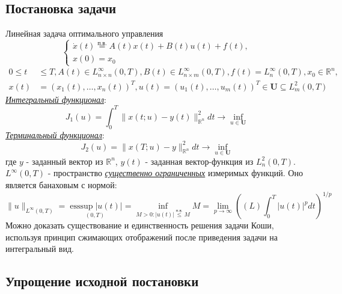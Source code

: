 \documentclass[A4]{article}
\begin{document}
\subsection{Постановка задачи}
Линейная задача оптимального управления
\begin{equation*}
\left\{\begin{array}{l}
\dot{x}(t)\stackrel{\text{п.в.}}{=}A(t)x(t)+B(t)u(t)+f(t),\\
x(0)=x_0
\end{array}\right.
\end{equation*}
\begin{equation*}
\begin{aligned}
0\leqslant t&\leqslant T,A(t)\in L^{\infty}_{n\times n}(0,T),B(t)\in L^{\infty}_{n\times m}(0,T),f(t)=L^{\infty}_{n}(0,T),x_0\in\mathbb{R}^n,\\
x(t)&=(x_1(t),\ldots,x_n(t))^T,u(t)=(u_1(t),\ldots,u_m(t))^T\in\mathbf{U}\subseteq L^2_m(0,T)
\end{aligned}
\end{equation*}
\underline{\emph{Интегральный функционал}}:
\begin{equation*}
J_1(u)=\int_{0}^{T}\|x(t;u)-y(t)\|^2_{\mathbb{R}^n}dt\rightarrow\inf_{u\in\mathbf{U}}
\end{equation*}
\underline{\emph{Терминальный функционал}}:
\begin{equation*}
J_2(u)=\|x(T;u)-y\|^2_{\mathbb{R}^n}dt\rightarrow\inf_{u\in\mathbf{U}}
\end{equation*}
где $y$ - заданный вектор из $\mathbb{R}^n$, $y(t)$ - заданная вектор-функция из $L^2_n(0,T)$.\\
$L^{\infty}(0,T)$ - пространство \underline{\emph{существенно ограниченных}} измеримых функций. Оно является банаховым с нормой:
\begin{equation*}
\|u\|_{L^{\infty}(0,T)}=\underset{(0,T)}{\operatorname{esssup}|u(t)|}=\inf_{M>0:|u(t)|\stackrel{п.в.}{\leqslant}M}M=\lim_{p\rightarrow\infty}\left((L)\int_{0}^{T}|u(t)|^pdt\right)^{1/p}
\end{equation*}
Можно доказать существование и единственность решения задачи Коши, используя принцип сжимающих отображений после приведения задачи на интегральный вид.
\subsection{Упрощение исходной постановки}
\end{document}
